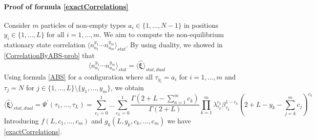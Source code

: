 \documentclass[10pt]{article}
\numberwithin{equation}{section}
\numberwithin{equation}{subsection}
\begin{document}
\paragraph{Proof of formula \eqref{exactCorrelations}} Consider $m$ particles of non-empty types $a_{i}\in\{1,\ldots,N-1\}$ in positions $y_{i}\in\{1,\ldots,L\}$ for all $i=1,\ldots,m$. We aim to compute the non-equilibrium stationary state correlation $\langle n_{a_{1}}^{y_{1}}\cdots n_{a_{m}}^{y_{m}} \rangle_{stat}$. By using duality, we showed in \eqref{CorrelationByABS-prob} that
 \begin{equation}
 	\langle n_{a_{1}}^{y_{1}}\cdots n_{a_{m}}^{y_{m}} \rangle_{stat}=\langle\hat{\bm{\xi}}\rangle_{stat,dual}
 \end{equation} 
Using formula \eqref{ABS} for a configuration where all $\tau_{y_{i}}=a_{i}$  for $i=1,\ldots,m$ and $\tau_{j}=N$ for $j\in\{1,\ldots,L\}\setminus \{y_{1},\ldots,y_{m}\}$, we obtain 
\begin{equation}
 \langle\hat{\bm{\xi}}\rangle_{stat,dual}=\Psi^{'}(\tau_{1},\ldots,\tau_{L})=\sum_{c_{1}=0}^{1}\ldots\sum_{c_{L}=0}^{1}\frac{\Gamma(2+L-\sum_{a=1}^{m}c_{k})}{\Gamma(2+L)}\prod_{k=1}^{m}\lambda_{\tau_{k}}^{c_{k}}\beta_{\tau_{k}}^{1-c_{k}}\left(2+L-y_{k}-\sum_{j=k}^{m}c_{j}\right)^{c_{k}}
\end{equation}
Introducing $f(L,c_{1},\ldots,c_{m})$ and $g_{k}(L,y_{k},c_{k},\ldots,c_{m})$ we have \eqref{exactCorrelations}.
\end{document}
